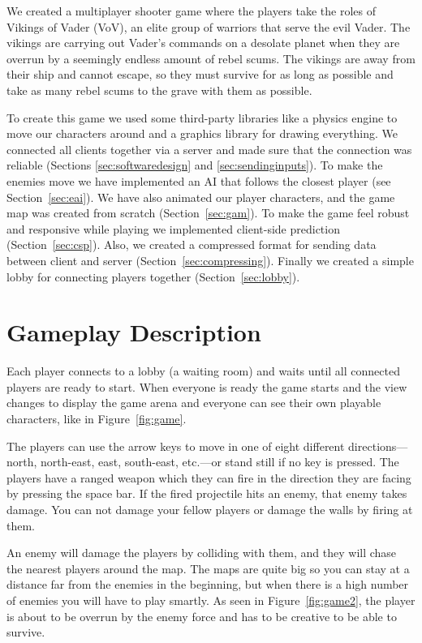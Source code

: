\documentclass[a4paper]{article}
\begin{document}
We created a multiplayer shooter game where the players take the roles of Vikings of Vader (VoV), an elite group of warriors that serve the evil Vader. The vikings are carrying out Vader's commands on a desolate planet when they are overrun by a seemingly endless amount of rebel scums. The vikings are away from their ship and cannot escape, so they must survive for as long as possible and take as many rebel scums to the grave with them as possible.

To create this game we used some third-party libraries like a physics engine to move our characters around and a graphics library for drawing everything. We connected all clients together via a server and made sure that the connection was reliable (Sections \ref{sec:softwaredesign} and \ref{sec:sendinginputs}). To make the enemies move we have implemented an AI that follows the closest player (see Section~\ref{sec:eai}). We have also animated our player characters, and the game map was created from scratch (Section~\ref{sec:gam}). To make the game feel robust and responsive while playing we implemented client-side prediction (Section~\ref{sec:csp}). Also, we created a compressed format for sending data between client and server (Section~\ref{sec:compressing}). Finally we created a simple lobby for connecting players together (Section~\ref{sec:lobby}).

\section{Gameplay Description}\label{sec:gameplay}
Each player connects to a lobby (a waiting room) and waits until all connected players are ready to start.
When everyone is ready the game starts and the view changes to display the game arena and everyone can see their own playable characters, like in Figure~\ref{fig:game}.

The players can use the arrow keys to move in one of eight different directions---north, north-east, east, south-east, etc.---or stand still if no key is pressed. The players have a ranged weapon which they can fire in the direction they are facing by pressing the space bar. If the fired projectile hits an enemy, that enemy takes damage. You can not damage your fellow players or damage the walls by firing at them.

An enemy will damage the players by colliding with them, and they will chase the nearest players around the map. The maps are quite big so you can stay at a distance far from the enemies in the beginning, but when there is a high number of enemies you will have to play smartly. As seen in Figure~\ref{fig:game2}, the player is about to be overrun by the enemy force and has to be creative to be able to survive.
\end{document}

